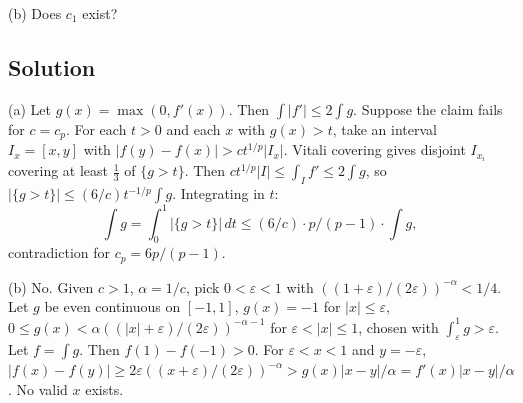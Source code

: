 \documentclass{article}
\begin{document}
(b) Does $c_1$ exist?

\subsection*{Solution}
(a) Let $g(x)=\max(0,f'(x))$. Then $\int|f'|\le 2\int g$. Suppose the claim fails for $c=c_p$. For each $t>0$ and each $x$ with $g(x)>t$, take an interval $I_x=[x,y]$ with $|f(y)-f(x)|>c t^{1/p}|I_x|$. Vitali covering gives disjoint $I_{x_i}$ covering at least $\frac 13$ of $\{g>t\}$. Then $ct^{1/p}|I| \le \int_I f' \le 2\int g$, so $|\{g>t\}|\le (6/c)t^{-1/p}\int g$. Integrating in $t$:
\[\int g = \int_0^1 |\{g>t\}|\,dt \le (6/c)\cdot p/(p-1)\cdot \int g,\]
contradiction for $c_p = 6p/(p-1)$.

(b) No. Given $c>1$, $\alpha=1/c$, pick $0<\varepsilon<1$ with $((1+\varepsilon)/(2\varepsilon))^{-\alpha}<1/4$. Let $g$ be even continuous on $[-1,1]$, $g(x)=-1$ for $|x|\le\varepsilon$, $0\le g(x)<\alpha((|x|+\varepsilon)/(2\varepsilon))^{-\alpha-1}$ for $\varepsilon<|x|\le 1$, chosen with $\int_\varepsilon^1 g > \varepsilon$. Let $f=\int g$. Then $f(1)-f(-1)>0$. For $\varepsilon<x<1$ and $y=-\varepsilon$, $|f(x)-f(y)|\ge 2\varepsilon((x+\varepsilon)/(2\varepsilon))^{-\alpha} > g(x)|x-y|/\alpha = f'(x)|x-y|/\alpha$. No valid $x$ exists.
\end{document}
